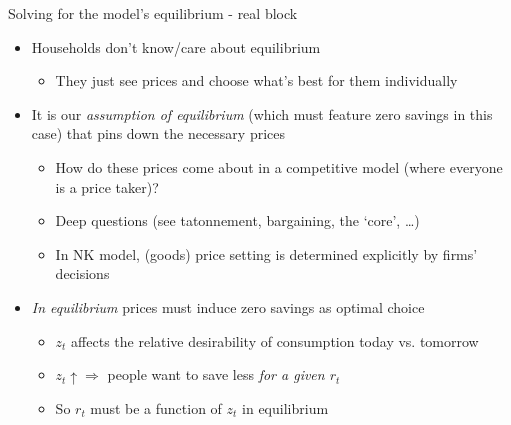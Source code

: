 

\begin{frame}{Solving for the model's equilibrium - real block}

\begin{itemize}
\item	Households don't know/care about equilibrium
	\begin{itemize}
	\item	They just see prices and choose what's best for them individually
	\end{itemize}

\vspace{2mm}
\item	It is our \emph{assumption of equilibrium} (which must feature zero savings in this case) that pins down the necessary prices
	\begin{itemize}
	\item	How do these prices come about in a competitive model (where everyone is a price taker)?
	\item	Deep questions (see tatonnement, bargaining, the `core', \ldots)
	\item	In NK model, (goods) price setting is determined explicitly by firms' decisions
	\end{itemize}

\vspace{2mm}
\item	\emph{In equilibrium} prices must induce zero savings as optimal choice
	\begin{itemize}
	\item	$z_{t}$ affects the relative desirability of consumption today vs. tomorrow
	\item	$z_{t} \uparrow \Rightarrow$ people want to save less \emph{for a given $r_{t}$}
	\item	So $r_{t}$ must be a function of $z_{t}$ in equilibrium
	\end{itemize}

\end{itemize}

\end{frame}



